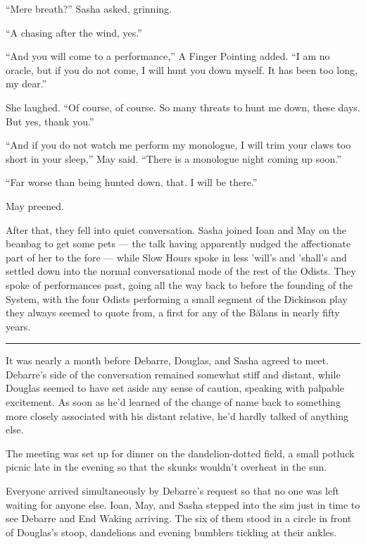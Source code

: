 ``Mere breath?'' Sasha asked, grinning.

``A chasing after the wind, yes.''

``And you will come to a performance,'' A Finger Pointing added. ``I am no oracle, but if you do not come, I will hunt you down myself. It has been too long, my dear.''

She laughed. ``Of course, of course. So many threats to hunt me down, these days. But yes, thank you.''

``And if you do not watch me perform my monologue, I will trim your claws too short in your sleep,'' May said. ``There is a monologue night coming up soon.''

``Far worse than being hunted down, that. I will be there.''

May preened.

After that, they fell into quiet conversation. Sasha joined Ioan and May on the beanbag to get some pets — the talk having apparently nudged the affectionate part of her to the fore — while Slow Hours spoke in less 'will's and 'shall's and settled down into the normal conversational mode of the rest of the Odists. They spoke of performances past, going all the way back to before the founding of the System, with the four Odists performing a small segment of the Dickinson play they always seemed to quote from, a first for any of the Bălans in nearly fifty years.

\begin{center}\rule{0.5\linewidth}{0.5pt}\end{center}

It was nearly a month before Debarre, Douglas, and Sasha agreed to meet. Debarre's side of the conversation remained somewhat stiff and distant, while Douglas seemed to have set aside any sense of caution, speaking with palpable excitement. As soon as he'd learned of the change of name back to something more closely associated with his distant relative, he'd hardly talked of anything else.

The meeting was set up for dinner on the dandelion-dotted field, a small potluck picnic late in the evening so that the skunks wouldn't overheat in the sun.

Everyone arrived simultaneously by Debarre's request so that no one was left waiting for anyone else. Ioan, May, and Sasha stepped into the sim just in time to see Debarre and End Waking arriving. The six of them stood in a circle in front of Douglas's stoop, dandelions and evening bumblers tickling at their ankles.

